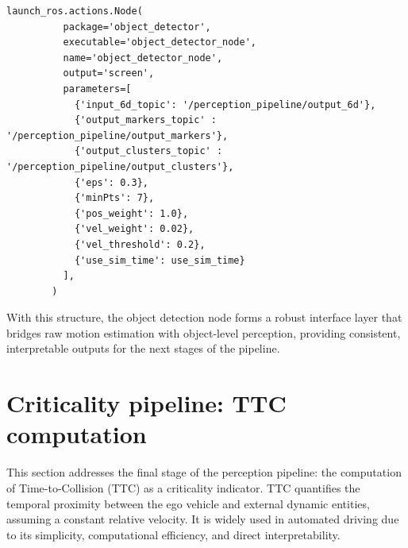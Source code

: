 \begin{lstlisting}[language=FTMpython,style=PythonStyleFTM,caption={Stereo computation launch},label={code:scl}]
  launch_ros.actions.Node(
          package='object_detector',
          executable='object_detector_node',
          name='object_detector_node',
          output='screen',
          parameters=[
            {'input_6d_topic': '/perception_pipeline/output_6d'},
            {'output_markers_topic' : '/perception_pipeline/output_markers'},
            {'output_clusters_topic' : '/perception_pipeline/output_clusters'},
            {'eps': 0.3},
            {'minPts': 7},
            {'pos_weight': 1.0},
            {'vel_weight': 0.02},
            {'vel_threshold': 0.2},
            {'use_sim_time': use_sim_time}
          ],
        )
\end{lstlisting}%


With this structure, the object detection node forms a robust interface layer that
bridges raw motion estimation with object-level perception, providing consistent,
interpretable outputs for the next stages of the pipeline.


\newpage

\section{Criticality pipeline: TTC computation}
\label{sec:CriticallityPipelineTTCComputation}

This section addresses the final stage of the perception pipeline:
the computation of Time-to-Collision (TTC) as a criticality indicator. 
TTC quantifies the temporal proximity between the ego vehicle and 
external dynamic entities, assuming a constant relative velocity. 
It is widely used in automated driving due to its simplicity, 
computational efficiency, and direct interpretability.

